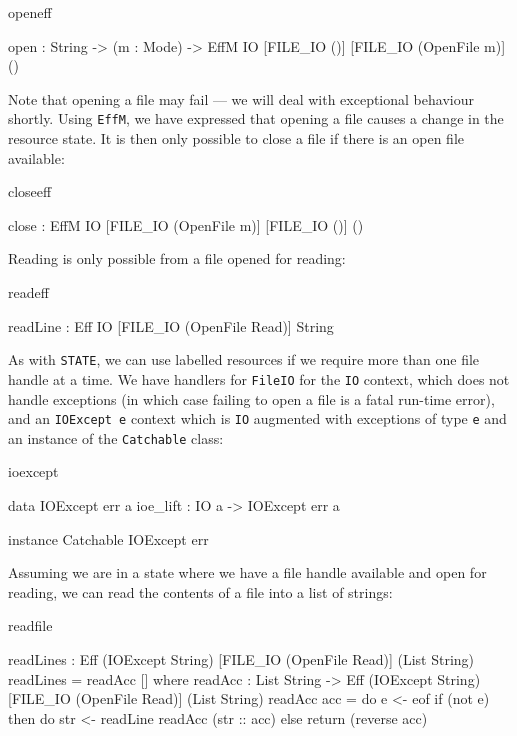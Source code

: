 \begin{SaveVerbatim}{openeff}

open : String -> (m : Mode) -> 
       EffM IO [FILE_IO ()] [FILE_IO (OpenFile m)] ()

\end{SaveVerbatim}

\noindent
Note that opening a file may fail --- we will deal with exceptional behaviour
shortly. 
Using \texttt{EffM}, we have expressed that opening a file causes a change in the
resource state.
It is then only possible to close a file if there is an open file
available:

\begin{SaveVerbatim}{closeeff}

close : EffM IO [FILE_IO (OpenFile m)] [FILE_IO ()] ()

\end{SaveVerbatim}

\noindent
Reading is only possible from a file opened for reading:

\begin{SaveVerbatim}{readeff}

readLine : Eff IO [FILE_IO (OpenFile Read)] String

\end{SaveVerbatim}

\noindent
As with \texttt{STATE}, we can use labelled resources if we require more than
one file handle at a time. We have handlers for \texttt{FileIO} for the
\texttt{IO} context, which does not handle exceptions (in which case failing
to open a file is a fatal run-time error), and an \texttt{IOExcept e}
context which is \texttt{IO} augmented with exceptions of type \texttt{e}
and an instance of the \texttt{Catchable} class:

\begin{SaveVerbatim}{ioexcept}

data IOExcept err a
ioe_lift : IO a -> IOExcept err a

instance Catchable IOExcept err

\end{SaveVerbatim}

\noindent
Assuming we are in a state where we have a file handle available and open
for reading, we can read the contents of a file into a list of strings:

\noindent
\begin{SaveVerbatim}{readfile}

 readLines : Eff (IOExcept String) 
                [FILE_IO (OpenFile Read)] (List String)
 readLines = readAcc [] where
   readAcc : List String -> 
             Eff (IOExcept String) 
                 [FILE_IO (OpenFile Read)] (List String)
   readAcc acc = do e <- eof
                    if (not e)
                       then do str <- readLine
                               readAcc (str :: acc)
                       else return (reverse acc)

\end{SaveVerbatim}


